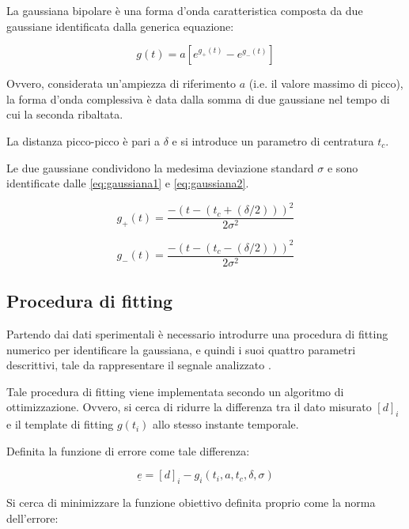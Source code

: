 La gaussiana bipolare è una forma d'onda caratteristica composta da due gaussiane identificata dalla generica equazione:

\begin{equation}
	g(t)=a\left[e^{g_{+}(t)}-e^{g_{-}(t)}\right]
	\label{eq:gaussianabipolare}
\end{equation}

Ovvero, considerata un'ampiezza di riferimento $a$ (i.e. il valore massimo di picco), la forma d'onda complessiva è data dalla somma di due gaussiane nel tempo di cui la seconda ribaltata. 

La distanza picco-picco è pari a $\delta$ e si introduce un parametro di centratura $t_c$. 

Le due gaussiane condividono la medesima deviazione standard $\sigma$ e sono identificate dalle \cref{eq:gaussiana1} e \cref{eq:gaussiana2}.

\begin{equation}
	g_{+}(t)=\frac{-\left(t-\left(t_{c} +(\delta / 2)\right)\right)^{2}}{2 \sigma^{2}}
	\label{eq:gaussiana1}
\end{equation}



\begin{equation}
	g_{-}(t)=\frac{-\left(t-\left(t_{c} -(\delta / 2)\right)\right)^{2}}{2 \sigma^{2}}
		\label{eq:gaussiana2}
\end{equation} 

\subsection{Procedura di fitting}

Partendo dai dati sperimentali è necessario introdurre una procedura di fitting numerico per identificare la gaussiana, e quindi i suoi quattro parametri descrittivi, tale da rappresentare il segnale analizzato \cite{caselli_simple_2016}.

Tale procedura di fitting viene implementata secondo un algoritmo di ottimizzazione. Ovvero, si cerca di ridurre la differenza tra il dato misurato $[d]_i$ e il template di fitting $g(t_i)$ allo stesso instante temporale. 

Definita la funzione di errore come tale differenza:

\begin{equation}
	\underline{e}=[d]_{i}-g_{i}\left(t_{i}, a,t_c,\delta,\sigma\right)
\end{equation}

Si cerca di minimizzare la funzione obiettivo definita proprio come la norma dell'errore:

